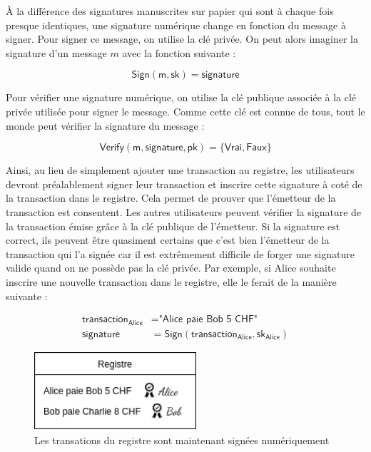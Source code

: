 À la différence des signatures manuscrites sur papier qui sont à chaque fois presque identiques, une signature numérique change en fonction du message à signer. Pour signer ce message, on utilise la clé privée. On peut alors imaginer la signature d'un message $m$ avec la fonction suivante :

\begin{equation*}
  \mathsf{Sign(m, sk)} = \mathsf{signature}
\end{equation*}

Pour vérifier une signature numérique, on utilise la clé publique associée à la clé privée utilisée pour signer le message. Comme cette clé est connue de tous, tout le monde peut vérifier la signature du message :

\begin{equation*}
  \mathsf{Verify(m, signature, pk)} = \{\mathsf{Vrai}, \mathsf{Faux}\}
\end{equation*}

Ainsi, au lieu de simplement ajouter une transaction au registre, les utilisateurs devront préalablement signer leur transaction et inscrire cette signature à coté de la transaction dans le registre. Cela permet de prouver que l'émetteur de la transaction est consentent. Les autres utilisateurs peuvent vérifier la signature de la transaction émise grâce à la clé publique de l'émetteur. Si la signature est correct, ils peuvent être quasiment certains que c'est bien l'émetteur de la transaction qui l'a signée car il est extrêmement difficile de forger une signature valide quand on ne possède pas la clé privée. Par exemple, si Alice souhaite inscrire une nouvelle transaction dans le registre, elle le ferait de la manière suivante :

\begin{align*}
  \mathsf{transaction_{Alice}} &= \textsf{"Alice paie Bob 5 CHF"}\\
  \mathsf{signature} &= \mathsf{Sign(transaction_{Alice}, sk_{Alice})}
\end{align*}

\begin{figure}[H]
  \centering
  \includegraphics[width=6cm]{images/crypto_3.png}
  \caption{Les transations du registre sont maintenant signées numériquement}
\end{figure}

